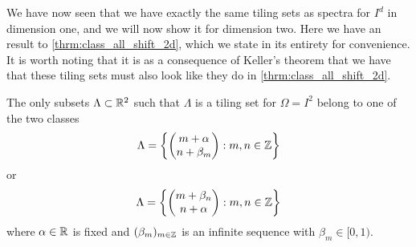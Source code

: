 \documentclass[../thesis.tex]{subfiles}
\begin{document}

We have now seen that we have exactly the same tiling sets as spectra for $I^d$ in dimension one, and we will now show it for dimension two. Here we have an  result to \cref{thrm:class_all_shift_2d}, which we state in its entirety for convenience. It is worth noting that it is as a consequence of Keller's theorem that we have that these tiling sets must also look like they do in \cref{thrm:class_all_shift_2d}.

\begin{theorem}\label{thrm:class_all_tiling_2d}
    The only subsets $\Lambda \subset \mathbb{R}^2$ such that $\Lambda$ is a tiling set for $\Omega = I^2$ belong to one of the two classes
    \begin{equation}\label{eq:2d_all_shift_class_1_tiling}
        \Lambda = \left\{
            \begin{pmatrix}
            m + \alpha \\
            n + \beta_m
            \end{pmatrix} : m,n \in  \mathbb{Z}
            \right\}
    \end{equation}
    or
    \begin{equation}\label{eq:2d_all_shift_class_2_tiling}
        \Lambda = \left\{
            \begin{pmatrix}
            m + \beta_n\\
            n + \alpha
            \end{pmatrix} : m,n \in  \mathbb{Z}
            \right\}
    \end{equation}
    where $\alpha \in \mathbb{R}$ is fixed and $(\beta_m)_{m\in \mathbb{Z}}$ is an infinite sequence with $\beta_m \in [0,1)$.
    
\end{theorem}
\end{document}
